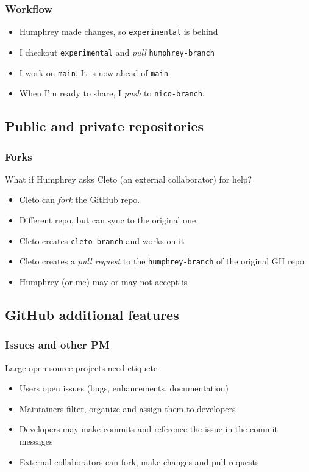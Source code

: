 \documentclass{beamer}
\begin{document}
\begin{frame}[fragile]
    \frametitle{Workflow}
    \begin{itemize}
        \item Humphrey made changes, so \verb|experimental| is behind
        \item I checkout \verb|experimental| and \textit{pull} \verb|humphrey-branch|
        \item I work on \verb|main|. It is now ahead of \verb|main|
        \item When I'm ready to share, I \textit{push} to \verb|nico-branch|.
    \end{itemize}
\end{frame} 

\subsection{Public and private repositories}

\begin{frame}
    \frametitle{Forks}
    What if Humphrey asks Cleto (an external collaborator) for help? 

    \begin{itemize}
        \item Cleto can \textit{fork} the GitHub repo. 
        \item Different repo, but can sync to the original one. 
        \item Cleto creates \verb|cleto-branch| and works on it
        \item Cleto creates a \textit{pull request} to the \verb|humphrey-branch| of the original GH repo
        \item Humphrey (or me) may or may not accept is
    \end{itemize}
\end{frame}

\subsection{GitHub additional features}

\begin{frame}
    \frametitle{Issues and other PM}
    Large open source projects need etiquete
    \begin{itemize}
        \item Users open issues (bugs, enhancements, documentation)
        \item Maintainers filter, organize and assign them to developers
        \item Developers may make commits and reference the issue in the commit messages
        \item External collaborators can fork, make changes and pull requests
    \end{itemize}
\end{frame}
\end{document}
